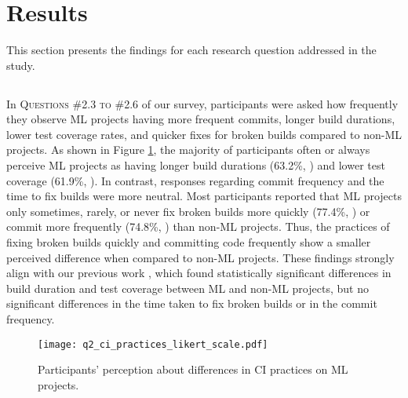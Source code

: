 \section{\textbf{Results}}
\label{sec:results}

This section presents the findings for each research question addressed in the study.

\subsection*{\textbf{\RQone}}

In \textsc{Questions \#2.3 to \#2.6} of our survey, participants were asked how frequently they observe ML projects having more frequent commits, longer build durations, lower test coverage rates, and quicker fixes for broken builds compared to non-ML projects. As shown in Figure \ref{fig:q2_ci_practices_likert_scale}, the majority of participants often or always perceive ML projects as having longer build durations (63.2\%, ) and lower test coverage (61.9\%, ). 
In contrast, responses regarding commit frequency and the time to fix builds were more neutral. Most participants reported that ML projects only sometimes, rarely, or never fix broken builds more quickly (77.4\%, ) or commit more frequently (74.8\%, ) than non-ML projects.
Thus, the practices of fixing broken builds quickly and committing code frequently show a smaller perceived difference when compared to non-ML projects. These findings strongly align with our previous work \citep{bernardo2024machine}, which found statistically significant differences in build duration and test coverage between ML and non-ML projects, but no significant differences in the time taken to fix broken builds or in the commit frequency.

\begin{figure}
	\centering
	\texttt{[image: q2\_ci\_practices\_likert\_scale.pdf]}
	\caption{Participants' perception about differences in CI practices on ML projects.}
	\label{fig:q2_ci_practices_likert_scale}       %
\end{figure}

